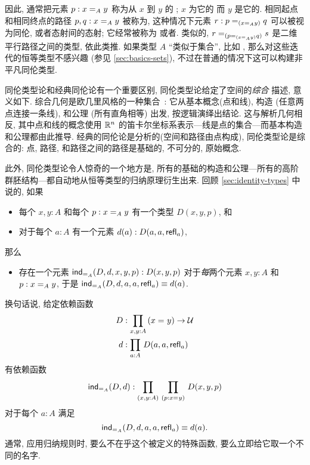 因此, 通常把元素 $p : \id[A]{x}{y}$ 称为从 $x$ 到 $y$ 的 ;
%
$x$ 为它的%
%
%
而 $y$ 是它的.
%
%
相同起点和相同终点的路径 $p,q : \id[A]{x}{y}$ 被称为,
%
%
这种情况下元素 $r : \id[{(\id[A]{x}{y})}]{p}{q}$ 可以被视为同伦, 或者态射间的态射;
它经常被称为
%
%
或者.
%
%
%
类似的, $\id[{(\id[{(\id[A]{x}{y})}]{p}{q})}]{r}{s}$ 是二维平行路径之间的类型,
%
依此类推.
如果类型 $A$ ``类似于集合'', 比如 \nat, 那么对这些迭代的恒等类型不感兴趣 (参见 \cref{sec:basics-sets}), 不过在普通的情况下这可以构建非平凡同伦类型.


同伦类型论和经典同伦论有一个重要区别, 同伦类型论给定了空间的\emph{综合}%
%
%
%
描述, 意义如下.
综合几何是欧几里风格的一种集合~\cite{Euclid}: 它从基本概念(点和线), 构造 (任意两点连接一条线), 和公理 (所有直角相等) 出发, 按逻辑演绎出结论.
这与解析几何相反,
%
其中点和线的概念使用 $\R^n$ 的笛卡尔坐标系表示---线是点的集合---而基本构造和公理都由此推导.
经典的同伦论是分析的(空间和路径由点构成), 同伦类型论是综合的: 点, 路径, 和路径之间的路径是基础的, 不可分的, 原始概念.

此外, 同伦类型论令人惊奇的一个地方是, 所有的基础的构造和公理---所有的高阶群胚结构---都自动地从恒等类型的归纳原理衍生出来.
回顾 \cref{sec:identity-types} 中说的, 如果
\begin{itemize}
    \item 每个 $x,y:A$ 和每个 $p:\id[A]xy$ 有一个类型 $D(x,y,p)$, 和
    \item 对于每个 $a:A$ 有一个元素 $d(a):D(a,a,\refl a)$,
\end{itemize}
那么
\begin{itemize}
    \item 存在一个元素 $\indid{A}(D,d,x,y,p):D(x,y,p)$ 对于\emph{每}两个元素 $x,y:A$ 和 $p:\id[A]xy$, 于是 $\indid{A}(D,d,a,a,\refl a) \jdeq d(a)$.
\end{itemize}
换句话说, 给定依赖函数
\begin{align*}
    D &:\prd{x,y:A} (\id{x}{y}) \to \type\\
    d &:\prd{a:A} D(a,a,\refl{a})
\end{align*}
有依赖函数
\[
    \indid{A}(D,d):\prd{x,y:A}{p:\id{x}{y}} D(x,y,p)
\]
对于每个 $a:A$ 满足
\begin{equation}
    \label{eq:Jconv}
    \indid{A}(D,d,a,a,\refl{a})\jdeq d(a).
\end{equation}
通常, 应用归纳规则时, 要么不在乎这个被定义的特殊函数, 要么立即给它取一个不同的名字.

